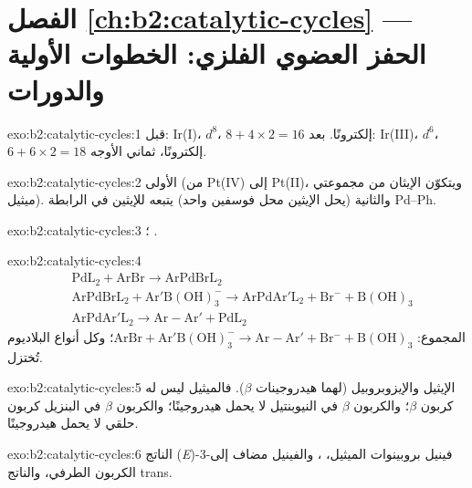 \section*{الفصل \ref{ch:b2:catalytic-cycles} --- الحفز العضوي الفلزي: الخطوات الأولية والدورات}

\begin{solution}{exo:b2:catalytic-cycles:1}
قبل: Ir(I)، $d^8$، $8 + 4 \times 2 = 16$ إلكترونًا. بعد: Ir(III)، $d^6$، $6 + 6 \times 2 = 18$
إلكترونًا، ثماني الأوجه.
\end{solution}

\begin{solution}{exo:b2:catalytic-cycles:2}
الأولى  (من Pt(IV) إلى Pt(II)، ويتكوّن الإيثان من مجموعتي ميثيل).
والثانية  (يحل الإيثين محل فوسفين واحد) يتبعه
 للإيثين في الرابطة Pd--Ph.
\end{solution}

\begin{solution}{exo:b2:catalytic-cycles:3}
؛ .
\end{solution}

\begin{solution}{exo:b2:catalytic-cycles:4}
\begin{align*}
  &\mathrm{PdL_2 + ArBr \to ArPdBrL_2}\\
  &\mathrm{ArPdBrL_2 + Ar'B(OH)_3^- \to ArPdAr'L_2 + Br^- + B(OH)_3}\\
  &\mathrm{ArPdAr'L_2 \to Ar{-}Ar' + PdL_2}
\end{align*}
المجموع: $\mathrm{ArBr + Ar'B(OH)_3^- \to Ar{-}Ar' + Br^- + B(OH)_3}$؛ وكل أنواع البلاديوم
تُختزل.
\end{solution}

\begin{solution}{exo:b2:catalytic-cycles:5}
الإيثيل والإيزوبروبيل (لهما هيدروجينات $\beta$). فالميثيل ليس له كربون $\beta$؛ والكربون $\beta$
في النيوبنتيل لا يحمل هيدروجينًا؛ والكربون $\beta$ في البنزيل كربون حلقي  لا يحمل
هيدروجينًا.
\end{solution}

\begin{solution}{exo:b2:catalytic-cycles:6}
الناتج (\textit{E})-3-فينيل بروبينوات الميثيل، ، والفينيل مضاف إلى
الكربون الطرفي، والناتج trans.
\end{solution}

